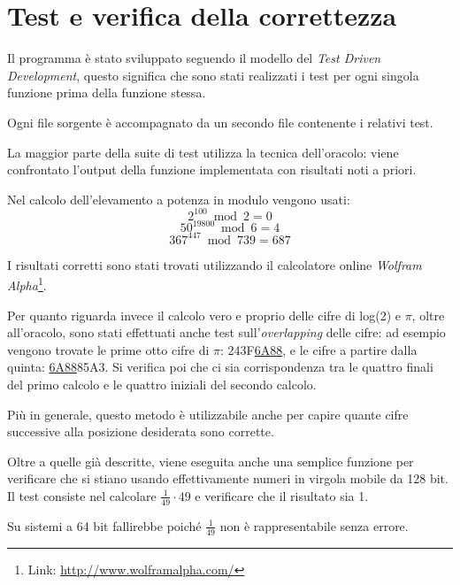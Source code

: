 \section{Test e verifica della correttezza}
Il programma è stato sviluppato seguendo il modello del \textit{Test Driven Development}, questo significa che sono stati realizzati i test per ogni singola funzione prima della funzione stessa.

Ogni file sorgente è accompagnato da un secondo file contenente i relativi test.

\noindent La maggior parte della suite di test utilizza la tecnica dell'oracolo: viene confrontato l'output della funzione implementata con risultati noti a priori.

Nel calcolo dell'elevamento a potenza in modulo vengono usati:
$$ 2^{100} \bmod 2 = 0 $$
$$ 50^{19800} \bmod 6 = 4 $$
$$ 367^{447} \bmod 739 = 687 $$

I risultati corretti sono stati trovati utilizzando il calcolatore online \textit{Wolfram Alpha}\footnote{Link: \href{http://www.wolframalpha.com/}{http://www.wolframalpha.com/}}.
\newline 

\noindent Per quanto riguarda invece il calcolo vero e proprio delle cifre di log(2) e $\pi$, oltre all'oracolo, sono stati effettuati anche test sull'\textit{overlapping} delle cifre: ad esempio vengono trovate le prime otto cifre di $\pi$: 243F\underline{6A88}, e le cifre a partire dalla quinta: \underline{6A88}85A3. Si verifica poi che ci sia corrispondenza tra le quattro finali del primo calcolo e le quattro iniziali del secondo calcolo.

Più in generale, questo metodo è utilizzabile anche per capire quante cifre successive alla posizione desiderata sono corrette.
\newline

\noindent Oltre a quelle già descritte, viene eseguita anche una semplice funzione per verificare che si stiano usando effettivamente numeri in virgola mobile da 128 bit. Il test consiste nel calcolare $\frac{1}{49} \cdot 49$ e verificare che il risultato sia 1.

Su sistemi a 64 bit fallirebbe poiché $\frac{1}{49}$ non è rappresentabile senza errore.